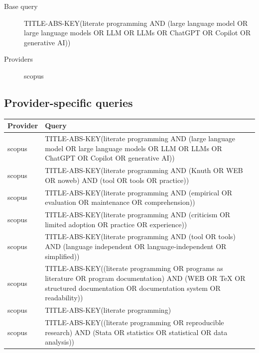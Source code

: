 \documentclass{article}
\begin{document}
\begin{description}
\item[Base query] TITLE-ABS-KEY(\textquotedbl{}literate programming\textquotedbl{} AND (\textquotedbl{}large language model\textquotedbl{} OR \textquotedbl{}large language models\textquotedbl{} OR LLM OR LLMs OR ChatGPT OR Copilot OR \textquotedbl{}generative AI\textquotedbl{}))
\item[Providers] scopus
\end{description}

\subsection{Provider-specific queries}
\begin{longtable}{lp{10cm}}
\toprule
Provider & Query \\
\midrule
scopus & TITLE-ABS-KEY(\textquotedbl{}literate programming\textquotedbl{} AND (\textquotedbl{}large language model\textquotedbl{} OR \textquotedbl{}large language models\textquotedbl{} OR LLM OR LLMs OR ChatGPT OR Copilot OR \textquotedbl{}generative AI\textquotedbl{})) \\
scopus & TITLE-ABS-KEY(\textquotedbl{}literate programming\textquotedbl{} AND (Knuth OR WEB OR noweb) AND (tool OR tools OR practice)) \\
scopus & TITLE-ABS-KEY(\textquotedbl{}literate programming\textquotedbl{} AND (empirical OR evaluation OR maintenance OR comprehension)) \\
scopus & TITLE-ABS-KEY(\textquotedbl{}literate programming\textquotedbl{} AND (criticism OR \textquotedbl{}limited adoption\textquotedbl{} OR practice OR experience)) \\
scopus & TITLE-ABS-KEY(\textquotedbl{}literate programming\textquotedbl{} AND (tool OR tools) AND (\textquotedbl{}language independent\textquotedbl{} OR \textquotedbl{}language-independent\textquotedbl{} OR simplified)) \\
scopus & TITLE-ABS-KEY((\textquotedbl{}literate programming\textquotedbl{} OR \textquotedbl{}programs as literature\textquotedbl{} OR \textquotedbl{}program documentation\textquotedbl{}) AND (WEB OR TeX OR \textquotedbl{}structured documentation\textquotedbl{} OR \textquotedbl{}documentation system\textquotedbl{} OR readability)) \\
scopus & TITLE-ABS-KEY(\textquotedbl{}literate programming\textquotedbl{}) \\
scopus & TITLE-ABS-KEY((\textquotedbl{}literate programming\textquotedbl{} OR \textquotedbl{}reproducible research\textquotedbl{}) AND (Stata OR statistics OR statistical OR \textquotedbl{}data analysis\textquotedbl{})) \\

\end{longtable}
\end{document}
